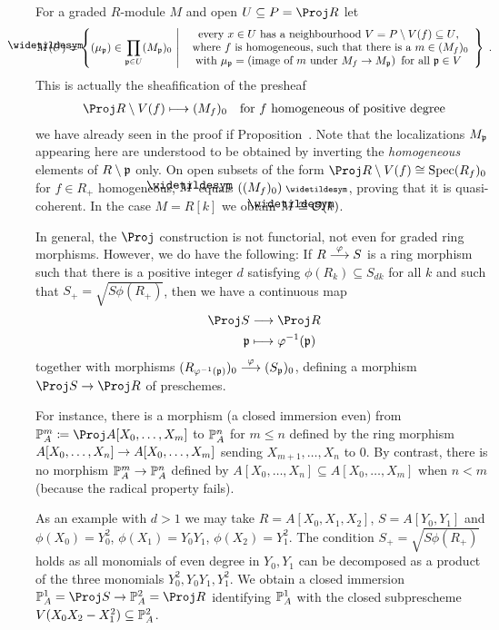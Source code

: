 \documentclass[a4paper,parskip=half,numbers=enddot, DIV=12]{scrreprt}
\renewcommand{\leq}{\leqslant}
\begin{document}
\begin{rem}
	For a graded $R$-module $M$ and open $U\subseteq P=\Proj R$ let 
	\begin{align*}
		\snake{M}(U)=\left\{(\mu_\pp)\in\prod_{\pp\in U}(M_\pp)_0\st\begin{array}{c}
		\text{every }x\in U\text{ has a neighbourhood }V=P\setminus V(f)\subseteq U\text{,}\\
		\text{ where }f\text{ is homogeneous,  such that there is a }m\in (M_f)_0\\
		\text{with }\mu_\pp=\left(\text{image of }m\text{ under }M_f\morphism M_\pp\right)\text{ for all }\pp\in V
		\end{array}\right\}\;.
	\end{align*}
	 This is actually the sheafification of the presheaf 
	 \begin{align*}
		 \Proj R\setminus V(f)\longmapsto (M_f)_0\quad\text{for }f\text{ homogeneous of positive degree}
	 \end{align*}
	 we have already seen in the proof if Proposition~. Note that the localizations $M_{\mathfrak{p}}$ appearing here are understood to be obtained by inverting the \emph{homogeneous} elements of $R\setminus \mathfrak{p}$ only. On open subsets of the form $\Proj R\setminus V(f)\cong \Spec (R_f)_0$ for $f\in R_+$ homogeneous, $\snake{M}$ equals $((M_f)_0)^\qcmod$, proving that it is quasi-coherent. In the case $M=R[k]$ we obtain $\snake{M}\cong \Oo(k)$.
\end{rem}
\begin{rem}
	In general, the $\Proj$ construction is not functorial, not even for graded ring morphisms. However, we do have the following: If $R\morphism[\phi]S$ is a ring morphism such that there is a positive integer $d$ satisfying $\phi(R_k)\subseteq S_{dk}$ for all $k$ and such that $S_+=\sqrt{S\phi(R_+)}$, then we have a continuous map
	\begin{align*}
		\Proj S&\morphism\Proj R\\
		\pp &\longmapsto\phi^{-1}(\pp)
	\end{align*}
	together with morphisms $(R_{\phi^{-1}(\pp)})_0\morphism[\phi](S_\pp)_0$, defining a morphism $\Proj S\morphism \Proj R$ of preschemes. 
	
	For instance, there is a morphism (a closed immersion even) from $\IP_A^m\coloneqq\Proj A[X_0,\ldots,X_m]$ to $\mathbb{P}_A^n$ for $m\leq n$ defined by the ring morphism $A[X_0,\ldots,X_n]\morphism A[X_0,\ldots,X_m]$ sending $X_{m+1},\ldots,X_n$ to $0$. By contrast, there is no morphism $\IP_A^m\morphism\IP_A^n$ defined by $A[X_0,\ldots,X_n]\subseteq A[X_0,\ldots,X_m]$ when $n<m$ (because the radical property fails).
	
	As an example with $d>1$ we may take $R=A[X_0,X_1,X_2]$, $S=A[Y_0,Y_1]$ and $\phi(X_0)=Y_0^2$, $\phi(X_1)=Y_0Y_1$, $\phi(X_2)=Y_1^2$. The condition $S_+=\sqrt{S\phi(R_+)}$ holds as all monomials of even degree in $Y_0,Y_1$ can be decomposed as a product of the three monomials $Y_0^2,Y_0Y_1,Y_1^2$. We obtain a closed immersion $\IP_A^1=\Proj S\morphism \IP_A^2=\Proj R$ identifying $\mathbb{P}_A^1$ with the closed subprescheme $V(X_0X_2-X_1^2)\subseteq \mathbb{P}_A^2$.
\end{rem}
\end{document}

